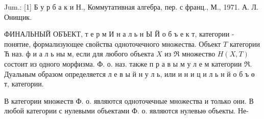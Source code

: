 \documentclass[10pt]{article}
\begin{document}
Jum.: [1] Б у р б а к и Н., Коммутативная алгебра, пер. с франц., М., 1971. А. Л. Онищик.



ФИНАЛЬНЫЙ ОБЪЕКТ, т е р м И н а л ь н Ы Й о б ъ е к т, категории - понятие, формализующее свойства одноточечного множества. Объект $T$ категории Ћ наз. ф и а л ь ны м, если для любого объекта $X$ из $\Re$ множество $H(X, T)$ состоит из одного морфизма. Ф. о. наз. также п р а в ы м у л е м категории $\mathfrak{R}$. Дуальным образом определяется л е в ы й н у л ь, или и н и ц и л ь н й $о$ б ъ ө т, категории.



В категории множеств Ф. о. являются одноточечные множества и только они. В любой категории с нулевыми объектами Ф. о. являются нулевыө объекты. Не-
\end{document}
